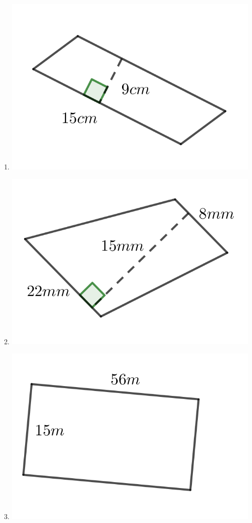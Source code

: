 \begin{multicols}{2}
\begin{enumerate}
	\item \includegraphics{./Images/Measurement/AreaQu7.png}
	\item \includegraphics{./Images/Measurement/AreaQu8.png}
	\item \includegraphics{./Images/Measurement/AreaQu9.png}

\end{enumerate}
\end{multicols}
